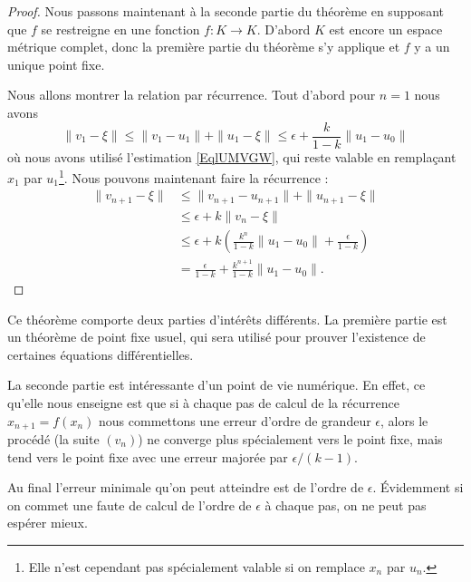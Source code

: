 \begin{proof}
    Nous passons maintenant à la seconde partie du théorème en supposant que \( f\) se restreigne en une fonction \( f\colon K\to K\). D'abord \( K\) est encore un espace métrique complet, donc la première partie du théorème s'y applique et \( f\) y a un unique point fixe.
    
    Nous allons montrer la relation par récurrence. Tout d'abord pour \( n=1\) nous avons
    \begin{equation}
        \| v_1-\xi \|\leq\| v_1-u_1 \|+\| u_1-\xi \|\leq \epsilon+\frac{ k }{ 1-k }\| u_1-u_0 \|
    \end{equation}
    où nous avons utilisé l'estimation \eqref{EqlUMVGW}, qui reste valable en remplaçant \( x_1\) par \( u_1\)\footnote{Elle n'est cependant pas spécialement valable si on remplace \( x_n\) par \( u_n\).}. Nous pouvons maintenant faire la récurrence :
    \begin{subequations}
        \begin{align}
            \| v_{n+1}-\xi \|&\leq \| v_{n+1}-u_{n+1} \|+\| u_{n+1}-\xi \|\\
            &\leq \epsilon+k\| v_n-\xi \|\\
            &\leq \epsilon+k\left( \frac{ k^n }{ 1-k }\| u_1-u_0 \|+\frac{ \epsilon }{ 1-k } \right)\\
            &=\frac{ \epsilon }{ 1-k }+\frac{ k^{n+1} }{ 1-k }\| u_1-u_0 \|.
        \end{align}
    \end{subequations}
\end{proof}

\begin{remark}
    Ce théorème comporte deux parties d'intérêts différents. La première partie est un théorème de point fixe usuel, qui sera utilisé pour prouver l'existence de certaines équations différentielles.

    La seconde partie est intéressante d'un point de vie numérique. En effet, ce qu'elle nous enseigne est que si à chaque pas de calcul de la récurrence \( x_{n+1}=f(x_n)\) nous commettons une erreur d'ordre de grandeur \( \epsilon\), alors le procédé (la suite \( (v_n)\)) ne converge plus spécialement vers le point fixe, mais tend vers le point fixe avec une erreur majorée par \( \epsilon/(k-1)\).
\end{remark}

\begin{remark}
Au final l'erreur minimale qu'on peut atteindre est de l'ordre de \( \epsilon\). Évidemment si on commet une faute de calcul de l'ordre de \( \epsilon\) à chaque pas, on ne peut pas espérer mieux.
\end{remark}

